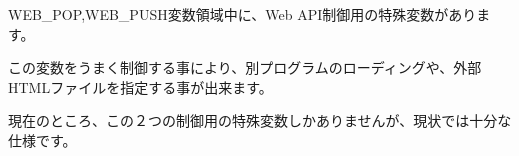WEB\_POP,WEB\_PUSH変数領域中に、Web API制御用の特殊変数があります。

この変数をうまく制御する事により、別プログラムのローディングや、外部HTMLファイルを指定する事が出来ます。

現在のところ、この２つの制御用の特殊変数しかありませんが、現状では十分な仕様です。
